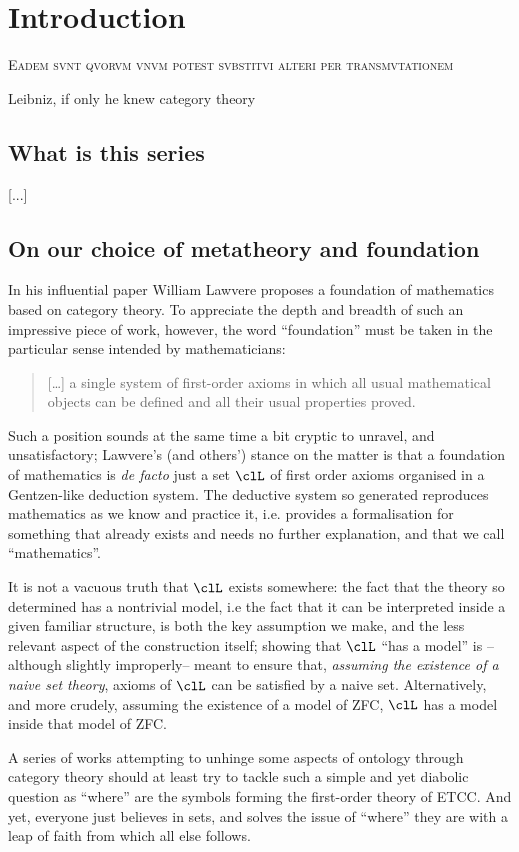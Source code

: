 \section{Introduction}
\epigraph{\textsc{Eadem svnt qvorvm vnvm potest svbstitvi alteri per transmvtationem}}{Leibniz, if only he knew category theory}
\subsection{What is this series}
[...]
\subsection{On our choice of metatheory and foundation}
In his influential paper \cite{} William Lawvere proposes a foundation of mathematics based on category theory. To appreciate the depth and breadth of such an impressive piece of work, however, the word ``foundation'' must be taken in the particular sense intended by mathematicians:
\begin{quote}
  [\dots\unkern] a single system of first-order axioms in which all usual mathematical objects can be defined and all their usual properties proved.
\end{quote}
Such a position sounds at the same time a bit cryptic to unravel, and unsatisfactory; Lawvere's (and others') stance on the matter is that a foundation of mathematics is \emph{de facto} just a set $\clL$ of first order axioms organised in a Gentzen-like deduction system. The deductive system so generated reproduces mathematics as we know and practice it, i.e. provides a formalisation for something that already exists and needs no further explanation, and that we call ``mathematics''.

It is not a vacuous truth that $\clL$ exists somewhere: the fact that the theory so determined has a nontrivial model, i.e the fact that it can be interpreted inside a given familiar structure, is both the key assumption we make, and the less relevant aspect of the construction itself; showing that $\clL$ ``has a model'' is --although slightly improperly-- meant to ensure that, \emph{assuming the existence of a naive set theory}, axioms of $\clL$ can be satisfied by a naive set. Alternatively, and more crudely, assuming the existence of a model of ZFC, $\clL$ has a model inside that model of ZFC.

A series of works attempting to unhinge some aspects of ontology through category theory should at least try to tackle such a simple and yet diabolic question as ``where'' are the symbols forming the first-order theory of ETCC. And yet, everyone just believes in sets, and solves the issue of ``where'' they are with a leap of faith from which all else follows.

